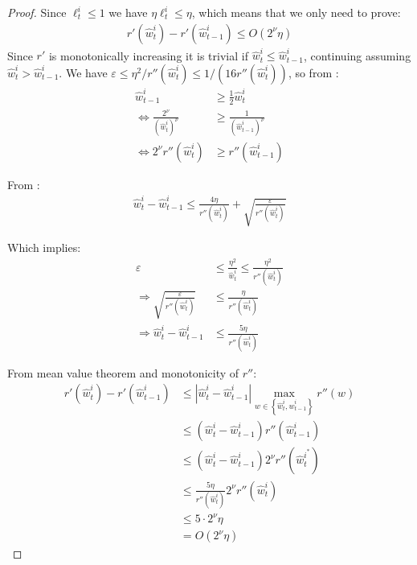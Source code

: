 \documentclass[10pt]{article}
\theoremstyle{definition}
\theoremstyle{remark}
\renewcommand{\epsilon}{\varepsilon}
\newcommand{\curly}[1]{ {\left\{ #1 \right\}}}
\newcommand{\roundy}[1]{ {\left( #1 \right)}}
\newcommand{\abs}[1]{ {\left | #1 \right |}}
\newcommand{\barconst}{\nu}
\begin{document}
\begin{proof}
Since $\ell_t^i \le 1$ we have $\eta\ell_t^i \le \eta$, which means that we only need to prove:
\begin{align*}
    r'(\hat{w}_t^{i}) - r'(\hat{w}_{t-1}^{i}) \le O\roundy{2^\barconst\eta}
\end{align*}
Since $r'$ is monotonically increasing it is trivial if $\hat{w}_t^i \le \hat{w}_{t-1}^i$, continuing assuming $\hat{w}_t^i > \hat{w}_{t-1}^i$. We have $\epsilon \le \eta^2/r''(\hat{w}_t^i) \le 1/(16r''(\hat{w}_t^{i}))$, so from :
\begin{align*}
    \hat{w}_{t-1}^{i}&\ge \frac{1}{2}\hat{w}_{t}^{i}\\
    \Leftrightarrow \frac{2^\barconst}{(\hat{w}_t^{i})^\barconst} &\ge \frac{1}{(\hat{w}_{t-1}^{i})^\barconst}\\
    \Leftrightarrow 2^\barconst r''(\hat{w}_t^{i}) &\ge r''(\hat{w}_{t-1}^{i})
\end{align*}

From :
\begin{align*}
    \hat{w}_{t}^{i} - \hat{w}_{t-1}^{i} \le \frac{4\eta}{r''(\hat{w}_{t}^{i})} + \sqrt{\frac{\epsilon}{r''(\hat{w}_{t}^{i})}}
\end{align*}

Which implies:
\begin{align*}
\epsilon &\le \frac{\eta^2}{\hat{w}_{t}^{i}} \le \frac{\eta^2}{r''(\hat{w}_t^{i})}\\
\Rightarrow \sqrt{\frac{\epsilon}{r''(\hat{w}_{t}^{i})}} &\le  \frac{\eta}{r''(\hat{w}_{t}^{i})}\\
    \Rightarrow \hat{w}_{t}^{i} - \hat{w}_{t-1}^{i} &\le \frac{5\eta}{r''(\hat{w}_{t}^{i})}
\end{align*}

From mean value theorem and monotonicity of $r''$: 
\begin{align*}
    r'(\hat{w}_{t}^{i}) - r'(\hat{w}_{t-1}^{i}) &\le \abs{\hat{w}_{t}^{i} - \hat{w}_{t-1}^{i}}\max_{w\in\curly{\hat{w}_t^{i},\hat{w}_{t-1}^{i}}} r''(w) 
    \\
    &\le \roundy{\hat{w}_{t}^{i} - \hat{w}_{t-1}^{i}}r''(\hat{w}_{t-1}^{i})
    \\
    &\le \roundy{\hat{w}_{t}^{i} - \hat{w}_{t-1}^{i}}2^\barconst r''(\hat{w}_{t}^{i^*})
    \\
    &\le \frac{5\eta}{r''(\hat{w}_{t}^{i})}2^{\barconst}r''(\hat{w}_{t}^{i}) \\
    &\le 5\cdot2^\barconst\eta\\
    &= O(2^\barconst \eta)
\end{align*}
\end{proof}
\end{document}
